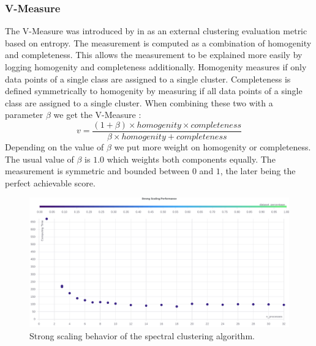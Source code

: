 \subsubsection{V-Measure}
\label{ssec:v_measure}
The V-Measure was introduced by \citeauthor{rosenberg_v-measure_2007} in \cite{rosenberg_v-measure_2007} as an external clustering evaluation metric based on entropy.
The measurement is computed as a combination of homogenity and completeness. This allows the measurement to be explained more easily by logging homogenity and completeness additionally.
Homogenity measures if only data points of a single class are assigned to a single cluster. Completeness is defined symmetrically to homogenity by measuring if all data points of a single class are assigned to
a single cluster.
When combining these two with a parameter \(\beta\) we get the V-Measure \cite{noauthor_23_2020}:
\[v = \frac{(1 + \beta) \times \mathit{homogenity} \times \mathit{completeness}}{\beta \times \mathit{homogenity} + \mathit{completeness}}\]
Depending on the value of \(\beta\) we put more weight on homogenity or completeness. The usual value of \(\beta\) is \(1.0\) which weights both components equally.
The measurement is symmetric and bounded between \(0\) and \(1\), the later being the perfect achievable score.



\begin{figure}
  \centering
  \includegraphics[width=0.9\linewidth]{images/strong_scaling_chart.pdf}
  \caption{Strong scaling behavior of the spectral clustering algorithm.}\label{fig:strong_scaling}
\end{figure}
